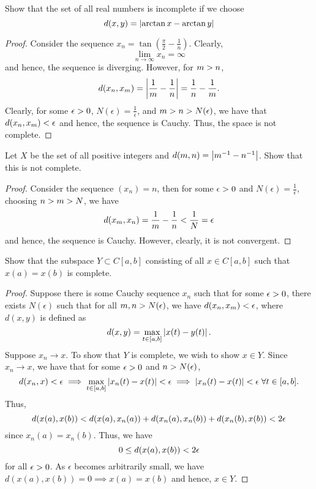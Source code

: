 \begin{question}
    Show that the set of all real numbers is incomplete if we choose 
    \[d(x,y) = \left\lvert \arctan x - \arctan y \right\rvert\]
    \label{section1.5-6}
\end{question}
\begin{proof}
    Consider the sequence $x_n = \tan \left(\frac{\pi}{2} - \frac{1}{n} \right)$. Clearly,
    \[\lim_{n \rightarrow \infty} x_n = \infty\]
    and hence, the sequence is diverging. However, for $m > n$, 
    \[d(x_n , x_m) = \left\lvert \frac{1}{m} - \frac{1}{n} \right\rvert = \frac{1}{n} - \frac{1}{m}.\]
    Clearly, for some $\epsilon > 0$, $N(\epsilon) = \frac{1}{\epsilon}$, and $m > n > N(
    \epsilon)$, we have that $d(x_n,x_m) < \epsilon$ and hence, the sequence is Cauchy. Thus, the space is not complete.
\end{proof}

\begin{question}
    Let $X$ be the set of all positive integers and $d(m,n) = \left\lvert m^{-1} - n^{-1} \right\rvert$. Show that this is not complete.
    \label{section1.5-7}
\end{question}
\begin{proof}
    Consider the sequence $(x_n) = n$, then for some $\epsilon > 0$ and $N(\epsilon) = \frac{1}{\epsilon}$, choosing $n > m > N$, we have
    \[d(x_m,x_n) = \frac{1}{m} - \frac{1}{n} < \frac{1}{N} = \epsilon\]
    and hence, the sequence is Cauchy. However, clearly, it is not convergent.
\end{proof}

\begin{question}
    Show that the subspace $Y \subset C[a,b]$ consisting of all $x \in C[a,b]$ such that $x(a) = x(b)$ is complete. 
    \label{section1.5-8}
\end{question}
\begin{proof}
    Suppose there is some Cauchy sequence $x_n$ such that for some $\epsilon > 0$, there exists $N(\epsilon)$ such that  for all $m , n > N(\epsilon)$, we have $d(x_n , x_m) < \epsilon$, where $d(x,y)$ is defined as
    \[d(x,y) = \max_{t \in [a,b]} \left\lvert x(t) - y(t) \right\rvert.\]
    Suppose $x_n \rightarrow x$. To show that $Y$ is complete, we wish to show $x \in Y$. 
    Since $x_n \rightarrow x$, we have that for some $\epsilon > 0$ and $n > N(\epsilon)$,
    \[d(x_n , x) < \epsilon \implies \max_{t \in [a,b]} \left\lvert x_n(t) - x(t) \right\rvert < \epsilon \implies  \left\lvert x_n(t) - x(t) \right\rvert < \epsilon \; \forall t \in [a,b].\]
    Thus,
    \[d(x(a) , x(b)) < d(x(a) , x_n(a)) + d(x_n(a) , x_n(b)) + d(x_n(b) , x(b)) < 2\epsilon\]
    since $x_n(a) = x_n(b)$. Thus, we have
    \[0 \leq d(x(a) , x(b)) < 2\epsilon\]
    for all $\epsilon > 0$. As $\epsilon$ becomes arbitrarily small, we have $d(x(a) , x(b)) = 0 \implies x(a) = x(b)$ and hence, $x \in Y$.
\end{proof}

